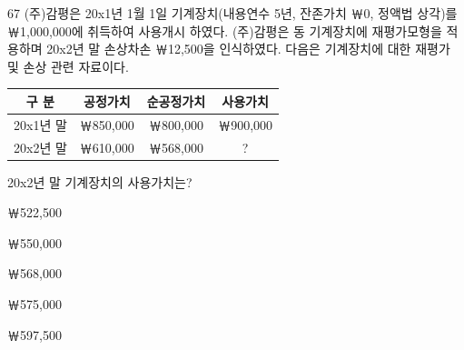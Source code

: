 \begin{question}{67}
(주)감평은 20x1년 1월 1일 기계장치(내용연수 5년, 잔존가치 ￦0, 정액법 상각)를 ￦1,000,000에 취득하여 사용개시 하였다. (주)감평은 동 기계장치에 재평가모형을 적용하며 20x2년 말 손상차손 ￦12,500을 인식하였다. 다음은 기계장치에 대한 재평가 및 손상 관련 자료이다.
\par{\small\centering\begin{tabular}{|c|c|c|c|}\hline
구 분 & 공정가치 & 순공정가치 & 사용가치 \\ \hline
20x1년 말 & ￦850,000 & ￦800,000 & ￦900,000 \\ \hline
20x2년 말 & ￦610,000 & ￦568,000 & ? \\ \hline
\end{tabular}\par}
20x2년 말 기계장치의 사용가치는?
\begin{choices}
  \item ￦522,500
  \item ￦550,000
  \item ￦568,000
  \item ￦575,000
  \item ￦597,500
\end{choices}
\end{question}
\answerall
{}
